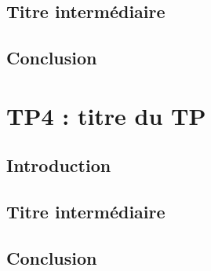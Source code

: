 \documentclass{article}
\begin{document}
\subsection{Titre intermédiaire}
\subsection{Conclusion}

\newpage
\section{TP4 : titre du TP}
\subsection{Introduction}
\subsection{Titre intermédiaire}
\subsection{Conclusion}
\end{document}
